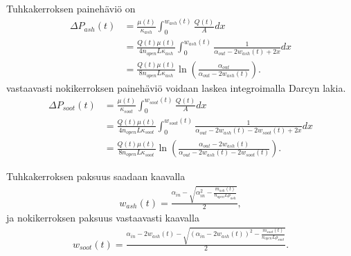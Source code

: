 Tuhkakerroksen painehäviö on
\begin{align}
    \Delta P_{ash}(t) &= \frac{\mu(t)}{\kappa_{ash}} \int_0^{w_{ash}(t)}  \frac{Q(t)}{A}dx 
    \nonumber\\ &= \frac{Q(t) \mu(t) }{4 n_{open} L \kappa_{ash}} \int_0^{w_{ash}(t)}  \frac{1}{\alpha_{out}-2w_{ash}(t)+2x}dx 
    \nonumber \\ &= \frac{Q(t)\mu(t)}{8 n_{open} L \kappa_{ash}}\ln\left(\frac{\alpha_{out}}{\alpha_{out}-2w_{ash}(t)}\right).
\end{align}
vastaavasti nokikerroksen painehäviö voidaan laskea integroimalla Darcyn lakia. 
\begin{align}
    \Delta P_{soot}(t) &= \frac{\mu(t)}{\kappa_{soot}} \int_{0}^{w_{soot}(t)}  \frac{Q(t)}{A}dx 
    \nonumber\\    &= \frac{Q(t) \mu(t) }{4 n_{open} L \kappa_{soot}} \int_{0}^{w_{soot}(t)}  \frac{1}{\alpha_{out}-2w_{ash}(t)-2w_{soot}(t)+2x}dx 
    \nonumber \\ &= \frac{Q(t)\mu(t)}{8 n_{open} L \kappa_{soot}}\ln\left(\frac{\alpha_{out}-2w_{ash}(t)}{\alpha_{out}-2w_{ash}(t)-2w_{soot}(t)}\right).
\end{align}

Tuhkakerroksen paksuus saadaan kaavalla
\begin{align}
    w_{ash}(t) = \frac{\alpha_{in} - \sqrt{\alpha_{in}^2 - \frac{m_{ash}(t)}{ n_{open} L \rho_{ash}}}}{2},
\end{align}
ja nokikerroksen paksuus vastaavasti kaavalla
\begin{align}
    w_{soot}(t)= \frac{\alpha_{in}-2w_{ash}(t) - \sqrt{(\alpha_{in}-2w_{ash}(t))^2 - \frac{m_{soot}(t)}{ n_{open} L \rho_{soot}}}}{2}.
\end{align}